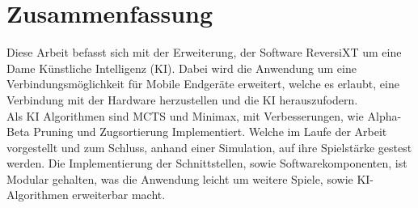 \thispagestyle{empty}
\section*{Zusammenfassung}

\bigskip 


Diese Arbeit befasst sich mit der Erweiterung, der Software ReversiXT um eine Dame Künstliche Intelligenz (KI). 
Dabei wird die Anwendung um eine Verbindungsmöglichkeit für Mobile Endgeräte erweitert, welche es erlaubt, eine Verbindung
mit der Hardware herzustellen und die KI herauszufodern.
\\
Als KI Algorithmen sind MCTS und Minimax, mit Verbesserungen, wie Alpha-Beta Pruning und Zugsortierung Implementiert.
Welche im Laufe der Arbeit vorgestellt und zum Schluss, anhand einer Simulation, auf ihre Spielstärke gestest werden.
Die Implementierung der Schnittstellen, sowie Softwarekomponenten, ist Modular gehalten, was die Anwendung 
leicht um weitere Spiele, sowie KI-Algorithmen erweiterbar macht. 